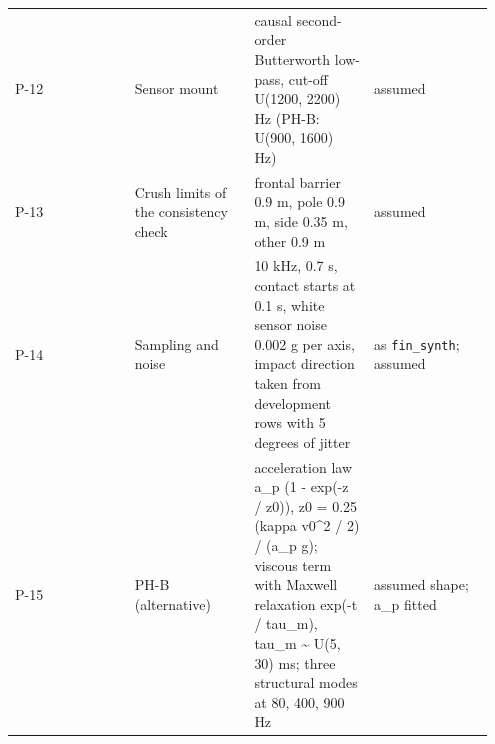{\begin{longtable}{p{0.237\linewidth}p{0.237\linewidth}p{0.237\linewidth}p{0.237\linewidth}}
P-12 & Sensor mount & causal second-order Butterworth low-pass, cut-off U(1200, 2200) Hz (PH-B: U(900, 1600) Hz) & assumed \\
P-13 & Crush limits of the consistency check & frontal barrier 0.9 m, pole 0.9 m, side 0.35 m, other 0.9 m & assumed \\
P-14 & Sampling and noise & 10 kHz, 0.7 s, contact starts at 0.1 s, white sensor noise 0.002 g per axis, impact direction taken from development rows with 5 degrees of jitter & as \texttt{fin\_synth}; assumed \\
P-15 & PH-B (alternative) & acceleration law a\_p (1 - exp(-z / z0)), z0 = 0.25 (kappa v0\textasciicircum{}2 / 2) / (a\_p g); viscous term with Maxwell relaxation exp(-t / tau\_m), tau\_m \textasciitilde{} U(5, 30) ms; three structural modes at 80, 400, 900 Hz & assumed shape; a\_p fitted \\
\bottomrule
\end{longtable}}



